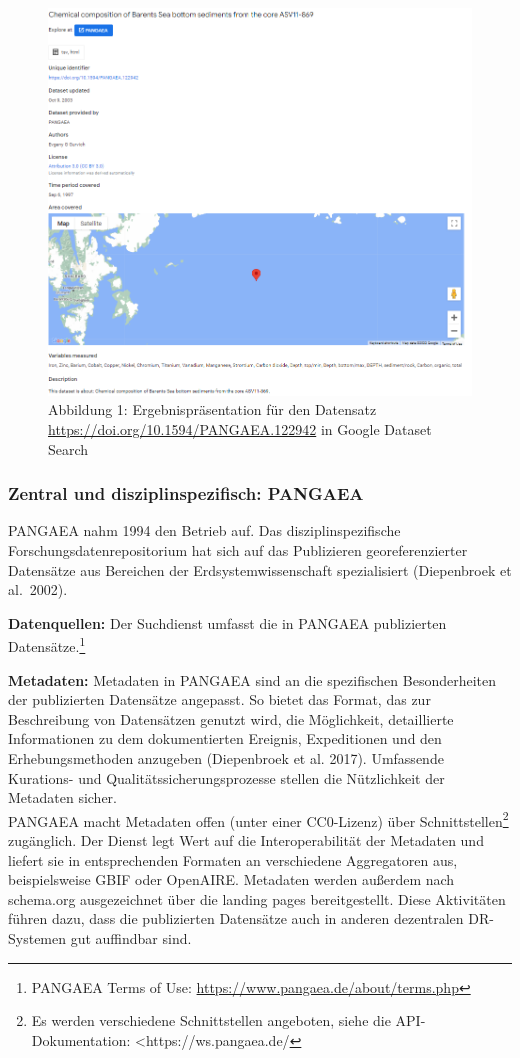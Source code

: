 \documentclass[a4paper,
fontsize=11pt,
oneside,
numbers=noperiodatend,
parskip=half-,
bibliography=totoc,
final
]{scrartcl}
\begin{document}
\begin{figure}
\centering
\includegraphics[width=.6\textwidth]{img/abb1_GDS_results.png}
\caption{Abbildung 1: Ergebnispräsentation für den Datensatz
\url{https://doi.org/10.1594/PANGAEA.122942} in Google Dataset Search}
\end{figure}

\hypertarget{zentral-und-disziplinspezifisch-pangaea}{%
\subsubsection{Zentral und disziplinspezifisch:
PANGAEA}\label{zentral-und-disziplinspezifisch-pangaea}}

PANGAEA nahm 1994 den Betrieb auf. Das disziplinspezifische
Forschungsdatenrepositorium hat sich auf das Publizieren
georeferenzierter Datensätze aus Bereichen der Erdsystemwissenschaft
spezialisiert (Diepenbroek et al.~2002).

\textbf{Datenquellen:} Der Suchdienst umfasst die in PANGAEA
publizierten Datensätze.\footnote{PANGAEA Terms of Use:
  \url{https://www.pangaea.de/about/terms.php}}

\textbf{Metadaten:} Metadaten in PANGAEA sind an die spezifischen
Besonderheiten der publizierten Datensätze angepasst. So bietet das
Format, das zur Beschreibung von Datensätzen genutzt wird, die
Möglichkeit, detaillierte Informationen zu dem dokumentierten Ereignis,
Expeditionen und den Erhebungsmethoden anzugeben (Diepenbroek et al.
2017). Umfassende Kurations- und Qualitätssicherungsprozesse stellen die
Nützlichkeit der Metadaten sicher.\\
PANGAEA macht Metadaten offen (unter einer CC0-Lizenz) über
Schnittstellen\footnote{Es werden verschiedene Schnittstellen angeboten,
  siehe die API-Dokumentation: \textless https://ws.pangaea.de/}
zugänglich. Der Dienst legt Wert auf die Interoperabilität der Metadaten
und liefert sie in entsprechenden Formaten an verschiedene Aggregatoren
aus, beispielsweise GBIF oder OpenAIRE. Metadaten werden außerdem nach
schema.org ausgezeichnet über die landing pages bereitgestellt. Diese
Aktivitäten führen dazu, dass die publizierten Datensätze auch in
anderen dezentralen DR-Systemen gut auffindbar sind.
\end{document}
